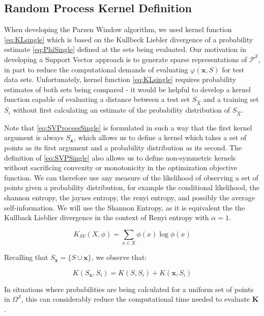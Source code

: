 \documentclass[10pt]{article}
\begin{document}
\subsection{  Random Process Kernel Definition }

When developing the Parzen Window algorithm, we used kernel function \ref{eq:KLsingle} which is based on the Kullbeck Liebler divergence of a probability estimate \ref{eq:PhiSingle} defined at the sets being evaluated.  Our motivation in developing a Support Vector approach is to generate sparse representations of \( \mathcal{P}^{\mathcal{S}} \), in part to reduce the computational demands of evaluating \( \varphi( \mathbf{x}, S) \) for test data sets.  Unfortunately, kernel function \ref{eq:KLsingle} requires probability estimates of both sets being compared - it would be helpful to develop a kernel function capable of evaluating a distance between a test set \( S_{\hat{X}} \) and a training set \( S_i \) without first calculating an estimate of the probability distribution of \( S_{\hat{X}} \).

Note that \ref{eq:SVProcessSingle} is formulated in such a way that the first kernel argument is always \( S_{\mathbf{x}} \), which allows us to define a kernel which takes a set of points as its first argument and a probability distribution as its second.  The definition of \ref{eq:SVPSingle} also allows us to define non-symmetric kernels without sacrificing convexity or monotonicity in the optimization objective function.  We can therefore use any measure of the likelihood of observing a set of points given a probability distribution, for example the conditional likelihood, the shannon entropy, the jaynes entropy, the renyi entropy, and possibly the average self-information.  We will use the Shannon Entropy, as it is equivalent the the Kullback Lieblier divergence in the context of Renyi entropy with \( \alpha = 1 \).

\begin{equation}
K_{SV}( X, \phi ) = \sum_{x \in X} \phi(x) \log \phi(x)
\end{equation}

Recalling that \( S_\mathbf{x} = \{ S \cup \mathbf{x} \} \), we observe that:

\begin{equation}
K( S_{\mathbf{x}}, S_i ) = K(S, S_i) + K( \mathbf{x}, S_i )
\end{equation}

In situations where probabilities are being calculated for a uniform set of points in \( \Omega^{\mathcal{S}} \), this can considerably reduce the computational time needed to evaluate \( \mathbf{K} \).
\end{document}

